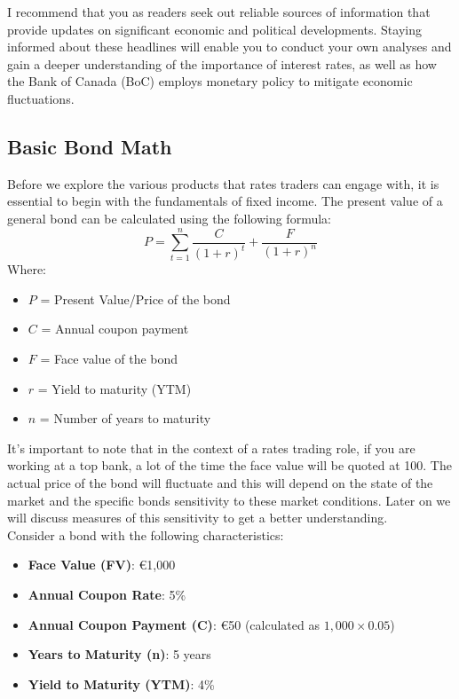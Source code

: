 \documentclass{article}
\begin{document}
I recommend that you as readers seek out reliable sources of information that provide updates on significant economic and political developments. Staying informed about these headlines will enable you to conduct your own analyses and gain a deeper understanding of the importance of interest rates, as well as how the Bank of Canada (BoC) employs monetary policy to mitigate economic fluctuations.

\subsection{Basic Bond Math}
\hspace{2em}
Before we explore the various products that rates traders can engage with, it is essential to begin with the fundamentals of fixed income. The present value of a general bond can be calculated using the following formula:
\[
P = \sum_{t=1}^{n} \frac{C}{(1 + r)^t} + \frac{F}{(1 + r)^n}
\]
Where:
\begin{itemize}
    \item \( P \) = Present Value/Price of the bond
    \item \( C \) = Annual coupon payment
    \item \( F \) = Face value of the bond
    \item \( r \) = Yield to maturity (YTM)
    \item \( n \) = Number of years to maturity
\end{itemize}

It's important to note that in the context of a rates trading role, if you are working at a top bank, a lot of the time the face value will be quoted at 100. The actual price of the bond will fluctuate and this will depend on the state of the market and the specific bonds sensitivity to these market conditions. Later on we will discuss measures of this sensitivity to get a better understanding.\\

Consider a bond with the following characteristics:
\begin{itemize}
    \item \textbf{Face Value (FV)}: €1,000
    \item \textbf{Annual Coupon Rate}: 5\%
    \item \textbf{Annual Coupon Payment (C)}: €50 (calculated as \( 1,000 \times 0.05 \))
    \item \textbf{Years to Maturity (n)}: 5 years
    \item \textbf{Yield to Maturity (YTM)}: 4\%
\end{itemize}
\end{document}

